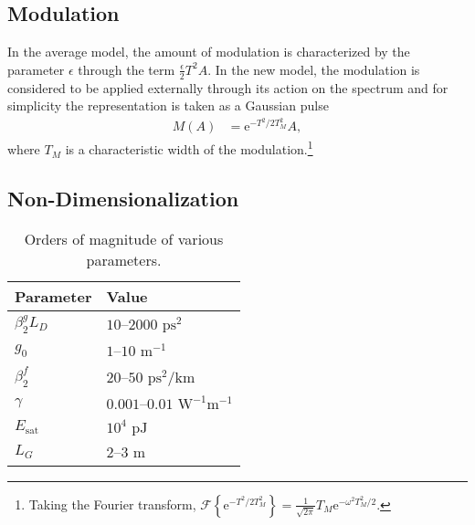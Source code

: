 \documentclass[12pt]{article}
\newcommand{\Es}{E_{\textrm{sat}}}
\newcommand{\FT}[1]{\mathcal{F}\left\{ #1 \right\}}
\begin{document}
\subsection{Modulation}
In the average model, the amount of modulation is characterized by the parameter $\epsilon$ through the term $\frac{\epsilon}{2}T^2 A$. In the new model, the modulation is considered to be applied externally through its action on the spectrum and for simplicity the representation is taken as a Gaussian pulse 
\begin{align}
	M(A) &= \textrm{e}^{-T^2 / 2 T_M^2} A,
\end{align}
where $T_M$ is a characteristic width of the modulation.\footnote{Taking the Fourier transform, $\FT{\textrm{e}^{-T^2/ 2 T_M^2}} = \frac{1}{\sqrt{2\pi}}T_M\textrm{e}^{-\omega^2T_M^2/2}$.}

\subsection{Non-Dimensionalization}

\begin{wraptable}{r}{0.45\textwidth}
\begin{center}
\begin{tabular}{|l|l|}
\hline
Parameter & Value \\
\hline
$\beta_2^g L_D$ & $10$--$2000 \text{ ps}^2$ \\
$g_0$ & $1$--$10 \text{ m}^{-1}$ \\
$\beta_2^f$ & $20$--$50 \text{ ps}^2/ \text{km}$ \\
$\gamma$ & $0.001$--$0.01 \text{ W}^{-1} \text{m}^{-1}$ \cite{agrawal2013} \\
$\Es$ & $10^4 \text{ pJ}$ \\
$L_G$ & $2$--$3 \text{ m}$ \cite{burgoyne2014, shtyrina, yarutkina} \\
\hline
\end{tabular}
\caption{Orders of magnitude of various parameters.}
\label{tab:values}
\end{center}
\end{wraptable}
\end{document}
